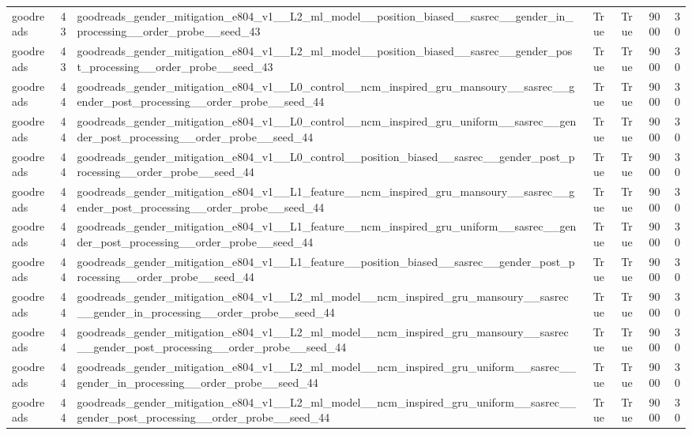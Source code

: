 \begin{table}[htbp!]
\begin{tabular}{lrlrrrr}
goodreads & 43 & goodreads\_gender\_mitigation\_e804\_v1\_\_L2\_ml\_model\_\_position\_biased\_\_sasrec\_\_gender\_in\_processing\_\_order\_probe\_\_seed\_43 & True & True & 9000 & 30 \\
goodreads & 43 & goodreads\_gender\_mitigation\_e804\_v1\_\_L2\_ml\_model\_\_position\_biased\_\_sasrec\_\_gender\_post\_processing\_\_order\_probe\_\_seed\_43 & True & True & 9000 & 30 \\
goodreads & 44 & goodreads\_gender\_mitigation\_e804\_v1\_\_L0\_control\_\_ncm\_inspired\_gru\_mansoury\_\_sasrec\_\_gender\_post\_processing\_\_order\_probe\_\_seed\_44 & True & True & 9000 & 30 \\
goodreads & 44 & goodreads\_gender\_mitigation\_e804\_v1\_\_L0\_control\_\_ncm\_inspired\_gru\_uniform\_\_sasrec\_\_gender\_post\_processing\_\_order\_probe\_\_seed\_44 & True & True & 9000 & 30 \\
goodreads & 44 & goodreads\_gender\_mitigation\_e804\_v1\_\_L0\_control\_\_position\_biased\_\_sasrec\_\_gender\_post\_processing\_\_order\_probe\_\_seed\_44 & True & True & 9000 & 30 \\
goodreads & 44 & goodreads\_gender\_mitigation\_e804\_v1\_\_L1\_feature\_\_ncm\_inspired\_gru\_mansoury\_\_sasrec\_\_gender\_post\_processing\_\_order\_probe\_\_seed\_44 & True & True & 9000 & 30 \\
goodreads & 44 & goodreads\_gender\_mitigation\_e804\_v1\_\_L1\_feature\_\_ncm\_inspired\_gru\_uniform\_\_sasrec\_\_gender\_post\_processing\_\_order\_probe\_\_seed\_44 & True & True & 9000 & 30 \\
goodreads & 44 & goodreads\_gender\_mitigation\_e804\_v1\_\_L1\_feature\_\_position\_biased\_\_sasrec\_\_gender\_post\_processing\_\_order\_probe\_\_seed\_44 & True & True & 9000 & 30 \\
goodreads & 44 & goodreads\_gender\_mitigation\_e804\_v1\_\_L2\_ml\_model\_\_ncm\_inspired\_gru\_mansoury\_\_sasrec\_\_gender\_in\_processing\_\_order\_probe\_\_seed\_44 & True & True & 9000 & 30 \\
goodreads & 44 & goodreads\_gender\_mitigation\_e804\_v1\_\_L2\_ml\_model\_\_ncm\_inspired\_gru\_mansoury\_\_sasrec\_\_gender\_post\_processing\_\_order\_probe\_\_seed\_44 & True & True & 9000 & 30 \\
goodreads & 44 & goodreads\_gender\_mitigation\_e804\_v1\_\_L2\_ml\_model\_\_ncm\_inspired\_gru\_uniform\_\_sasrec\_\_gender\_in\_processing\_\_order\_probe\_\_seed\_44 & True & True & 9000 & 30 \\
goodreads & 44 & goodreads\_gender\_mitigation\_e804\_v1\_\_L2\_ml\_model\_\_ncm\_inspired\_gru\_uniform\_\_sasrec\_\_gender\_post\_processing\_\_order\_probe\_\_seed\_44 & True & True & 9000 & 30 \\

\end{tabular}
\end{table}
